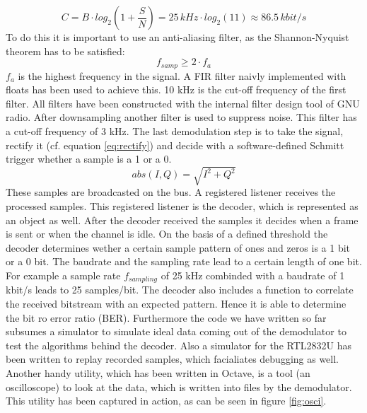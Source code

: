 \documentclass[conference]{IEEEtran}
\begin{document}
\begin{equation}
	\label{eq:awgn}
	C=B \cdot log_2(1+\frac{S}{N})= 25\,kHz \cdot log_2(11) \approx 86.5\,kbit/s
\end{equation}     
To do this it is important to use an anti-aliasing filter, as the Shannon-Nyquist theorem has to be satisfied: 
\begin{equation}
	\label{eq:nyquist}
	f_{samp} \geq 2 \cdot f_{a}
\end{equation}
\ensuremath{f_{a}} is the highest frequency in the signal. 
A FIR filter naivly implemented with floats has been used to achieve this. 10 kHz is the cut-off frequency of the first filter. All filters have been constructed with the internal filter design tool of GNU radio. After downsampling another filter is used to suppress noise. This filter has a cut-off frequency of 3 kHz. The last demodulation step is to take the signal, rectify it (cf. equation \ref{eq:rectify}) and decide with a software-defined Schmitt trigger whether a sample is a 1 or a 0. 
\begin{equation}
	\label{eq:rectify}
	abs(I,Q) = \sqrt{I^2 +  Q^2}
\end{equation} 
These samples are broadcasted on the bus. A registered listener receives the processed samples. This registered listener is the decoder, which is represented as an object as well. After the decoder received the samples it decides when a frame is sent or when the channel is idle. On the basis of a defined threshold the decoder determines wether a certain sample pattern of ones and zeros is a 1 bit or a 0 bit. The baudrate and the sampling rate lead to a certain length of one bit. For example a sample rate \ensuremath{f_{sampling}} of 25 kHz combinded with a baudrate of 1 kbit/s leads to 25 samples/bit. The decoder also includes a function to correlate the received bitstream with an expected pattern. Hence it is able to determine the bit ro error ratio (BER). 
Furthermore the code we have written so far subsumes a simulator to simulate ideal data coming out of the demodulator to test the algorithms behind the decoder. Also a simulator for the RTL2832U has been written to replay recorded samples, which facialiates debugging as well.    
Another handy utility, which has been written in Octave, is a tool (an oscilloscope) to look at the data, which is written into files by the demodulator. This utility has been captured in action, as can be seen in figure \ref{fig:osci}. 
\end{document}

